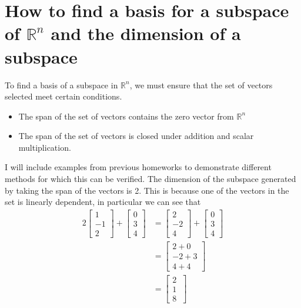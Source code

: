 \documentclass{report}
\begin{document}
\section{How to find a basis for a subspace of $\mathbb{R}^n$ and the dimension of a subspace}
To find a basis of a subspace in $\mathbb{R}^n$,  we must ensure that the set of vectors selected meet certain conditions.
\begin{itemize}
\item The span of the set of vectors contains the zero vector from $\mathbb{R}^n$
\item The span of the set of vectors is closed under addition and scalar multiplication.
\end{itemize}
I will include examples from previous homeworks to demonstrate different methods for which this can be verified. 
\sol The dimension of the subspace generated by taking the span of the vectors is 2. This is because one of the vectors in the set is linearly dependent, in particular we can see that
$$
\begin{aligned}
	2 \begin{bmatrix} 1 \\ -1 \\ 2 \end{bmatrix} +
	\begin{bmatrix} 0 \\ 3 \\ 4 \end{bmatrix}  & =
	\begin{bmatrix} 2 \\ -2 \\ 4 \end{bmatrix} +
	\begin{bmatrix} 0 \\ 3 \\ 4 \end{bmatrix} \\
	& = \begin{bmatrix} 2 + 0 \\ -2 + 3 \\ 4 + 4 \end{bmatrix} \\
	& = \begin{bmatrix} 2 \\ 1 \\ 8 \ \end{bmatrix}
\end{aligned}
$$
\end{document}
